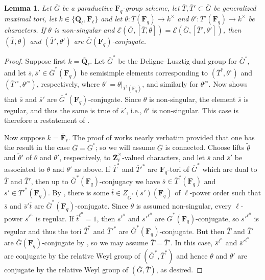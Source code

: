 \documentclass[reqno]{amsart}
\numberwithin{equation}{subsection}
\newcommand{\F}{\mathbf{F}}
\newcommand{\wt}[1]{\widetilde{#1}}
\newcommand{\Q}{\mathbf{Q}}
\newcommand{\Z}{\mathbf{Z}}
\newcommand{\ol}[1]{\overline{#1}}
\newcommand{\co}{\colon}
\newcommand\cE{\mathcal{E}}
\newtheorem{lemma}[thm]{Lemma}
\theoremstyle{remark}
\numberwithin{equation}{subsection}
\numberwithin{figure}{subsection}
\begin{document}
\begin{lemma}\label{lemma:non-singular-conjugacy}
    Let $\ol G$ be a paraductive $\F_q$-group scheme, let $\ol T, \ol T' \subset \ol G$ be generalized maximal tori, let $k \in \{\ol\Q_\ell, \ol\F_\ell\}$ and let $\theta\co \ol T(\F_q) \to k^\times$ and $\theta'\co \ol T'(\F_q) \to k^\times$ be characters. If $\theta$ is non-singular and $\cE(\ol G, [\ol T, \theta]) = \cE(\ol G, [\ol T', \theta'])$, then $(\ol T, \theta)$ and $(\ol T', \theta')$ are $\ol G(\F_q)$-conjugate.
\end{lemma}

\begin{proof}
    Suppose first $k = \ol\Q_\ell$. Let $\ol G^*$ be the Deligne--Lusztig dual group for $\ol G^\circ$, and let $\ol s, \ol s' \in \ol G^*(\F_q)$ be semisimple elements corresponding to $(\ol T^\circ, \theta^\circ)$ and $(\ol T'^\circ, \theta'^\circ)$, respectively, where $\theta^\circ = \theta|_{\ol T^\circ(\F_q)}$, and similarly for $\theta'^\circ$. Now \cite[Th\'eor\`eme 11.8]{Bon06} shows that $\ol s$ and $\ol s'$ are $\ol G^*(\F_q)$-conjugate. Since $\theta$ is non-singular, the element $\ol s$ is regular, and thus the same is true of $\ol s'$, i.e., $\theta'$ is non-singular. This case is therefore a restatement of \cite[Proposition~2.6.11]{Kal21b}.
    
    Now suppose $k = \ol\F_\ell$. The proof of \cite[Proposition~2.6.11]{Kal21b} works nearly verbatim provided that one has the result in the case $\ol G = \ol G^\circ$; so we will assume $\ol G$ is connected. Choose lifts $\wt\theta$ and $\wt\theta'$ of $\theta$ and $\theta'$, respectively, to $\ol\Z_\ell^\times$-valued characters, and let $\ol s$ and $\ol s'$ be associated to $\theta$ and $\theta'$ as above. If $\ol T^*$ and $\ol T'^*$ are $\F_q$-tori of $\ol G^*$ which are dual to $\ol T$ and $\ol T'$, then up to $\ol G^*(\F_q)$-conjugacy we have $\ol s \in \ol T^*(\F_q)$ and $\ol s' \in \ol T'^*(\F_q)$. By \cite[Th\'eor\`eme 2.2]{BM89}, there is some $\ol t \in Z_{\ol G^*}(\ol s')(\F_q)$ of $\ell$-power order such that $\ol s$ and $\ol s'\ol t$ are $\ol G^*(\F_q)$-conjugate. Since $\theta$ is assumed non-singular, every $\ell$-power $\ol s^{\ell^n}$ is regular. If $\ol t^{\ell^n} = 1$, then $\ol s^{\ell^n}$ and $\ol s'^{\ell^n}$ are $\ol G^*(\F_q)$-conjugate, so $\ol s'^{\ell^n}$ is regular and thus the tori $\ol T^*$ and $\ol T'^*$ are $\ol G^*(\F_q)$-conjugate. But then $\ol T$ and $\ol T'$ are $\ol G(\F_q)$-conjugate by \cite[(5.21.4)]{DL76}, so we may assume $\ol T = \ol T'$. In this case, $\ol s^{\ell^n}$ and $\ol s'^{\ell^n}$ are conjugate by the relative Weyl group of $(\ol G^*, \ol T^*)$ and hence $\theta$ and $\theta'$ are conjugate by the relative Weyl group of $(\ol G, \ol T)$, as desired.
\end{proof}
\end{document}
